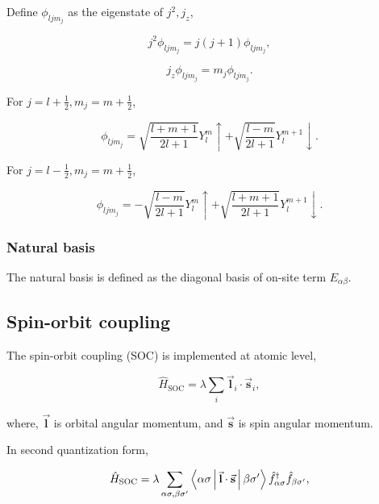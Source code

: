 Define $\phi_{ljm_{j}}$ as the eigenstate of $j^{2},j_{z}$,

\begin{equation}
j^{2}\phi_{ljm_{j}}=j(j+1)\phi_{ljm_{j}},
\end{equation}


\begin{equation}
j_{z}\phi_{ljm_{j}}=m_{j}\phi_{ljm_{j}}.
\end{equation}


For $j=l+\frac{1}{2},m_{j}=m+\frac{1}{2}$,

\begin{equation}
\phi_{ljm_{j}}=\sqrt{\frac{l+m+1}{2l+1}}Y_{l}^{m}\uparrow+\sqrt{\frac{l-m}{2l+1}}Y_{l}^{m+1}\downarrow.
\end{equation}


For $j=l-\frac{1}{2},m_{j}=m+\frac{1}{2}$,

\begin{equation}
\phi_{ljm_{j}}=-\sqrt{\frac{l-m}{2l+1}}Y_{l}^{m}\uparrow+\sqrt{\frac{l+m+1}{2l+1}}Y_{l}^{m+1}\downarrow.
\end{equation}



\subsubsection{Natural basis}

The natural basis is defined as the diagonal basis of on-site term
$E_{\alpha\beta}$.


\subsection{Spin-orbit coupling}

The spin-orbit coupling (SOC) is implemented at atomic level, 

\begin{equation}
\hat{H}_{\text{SOC}}=\lambda\sum_{i}\vec{\mathbf{l}}_{i}\cdot\vec{\mathbf{s}}_{i},
\end{equation}


where, $\vec{\mathbf{l}}$ is orbital angular momentum, and $\vec{\mathbf{s}}$
is spin angular momentum. 

In second quantization form,

\begin{equation}
\hat{H}_{\text{SOC}}=\lambda\sum_{\alpha\sigma,\beta\sigma^{\prime}}\Braket{\alpha\sigma|\vec{\mathbf{l}}\cdot\vec{\mathbf{s}}|\beta\sigma^{\prime}}\hat{f}_{\alpha\sigma}^{\dagger}\hat{f}_{\beta\sigma^{\prime}},
\end{equation}


